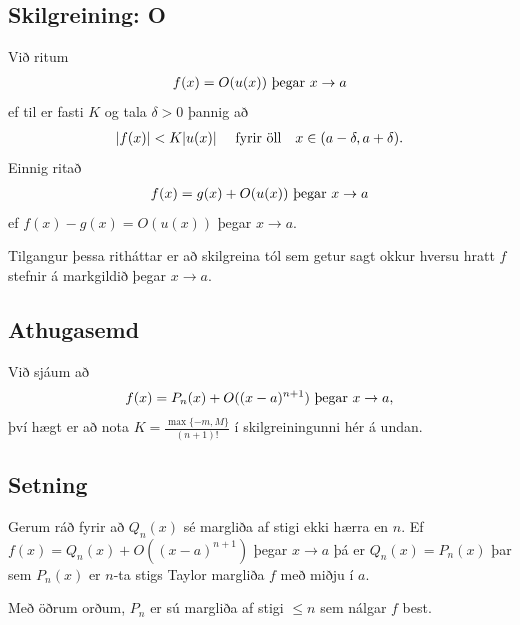 \documentclass[b5paper,10pt,icelandic]{sphinxmanual}
\begin{document}
\subsection{Skilgreining: O}
\label{kafli03:index-14}\label{kafli03:skilgreining-o}
Við ritum
\begin{gather}
\begin{split}f(x)=O(u(x)) \mbox{ þegar } x\rightarrow a\end{split}\notag
\end{gather}
ef til er fasti \(K\) og tala \(\delta>0\) þannig að
\begin{gather}
\begin{split}|f(x)|<K|u(x)|\quad\mbox{ fyrir öll}\quad x\in(a-\delta, a+\delta).\end{split}\notag
\end{gather}
Einnig ritað
\begin{gather}
\begin{split}f(x)=g(x)+O(u(x)) \mbox{ þegar }x\rightarrow a\end{split}\notag
\end{gather}
ef \(f(x)-g(x)=O(u(x))\) þegar \(x\rightarrow a\).

Tilgangur þessa ritháttar er að skilgreina tól sem getur sagt okkur
hversu hratt \(f\) stefnir á markgildið þegar \(x\to a\).


\subsection{Athugasemd}
\label{kafli03:id21}
Við sjáum að
\begin{gather}
\begin{split}f(x) = P_n(x) + O((x-a)^{n+1}) \mbox{ þegar } x\rightarrow a,\end{split}\notag
\end{gather}
því hægt er að nota \(K = \frac{\max\{-m,M\}}{(n+1)!}\) í skilgreiningunni
hér á undan.


\subsection{Setning}
\label{kafli03:id22}
Gerum ráð fyrir að \(Q_n(x)\) sé margliða af stigi ekki hærra en
\(n\). Ef \(f(x)=Q_n(x)+O((x-a)^{n+1})\) þegar
\(x\rightarrow a\) þá er \(Q_n(x)=P_n(x)\) þar sem
\(P_n(x)\) er \(n\)-ta stigs Taylor margliða \(f\) með miðju
í \(a\).

Með öðrum orðum, \(P_n\) er sú margliða af stigi \(\leq n\) sem
nálgar \(f\) best.
\end{document}

